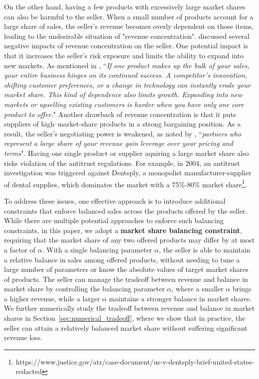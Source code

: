 \documentclass[mnsc,non-blindrev]{informs3}
\theoremstyle{definition}
\begin{document}
{On the other hand, having a few products with excessively large market shares can also be harmful to the seller. When a small number of products account for a large share of sales, the seller’s revenue becomes overly dependent on those items, leading to the undesirable situation of "revenue concentration". \cite{dealhub2025revenue} discussed several negative impacts of revenue concentration on the seller. One potential impact is that it increases the seller’s risk exposure and limits the ability to expand into new markets. As mentioned in \cite{dealhub2025revenue}, ``{\it If one product makes up the bulk of your sales, your entire business hinges on its continued success. A competitor’s innovation, shifting customer preferences, or a change in technology can instantly erode your market share. This kind of dependence also limits growth. Expanding into new markets or upselling existing customers is harder when you have only one core product to offer.}" Another drawback of revenue concentration is that it puts suppliers of high–market-share products in a strong bargaining position. As a result, the seller’s negotiating power is weakened, as noted by \cite{dealhub2025revenue}, ``{\it partners who represent a large share of your revenue gain leverage over your pricing and terms}". Having one single product or supplier aquiring a large market share also risks violation of the antitrust regulations. For example, in 2004, an antitrust investigation was triggered against Dentsply, a monopolist manufacturer-supplier of dental supplies, which dominates the market with a 75\%-80\% market share\footnote{https://www.justice.gov/atr/case-document/us-v-dentsply-brief-united-states-redacted}.

To address these issues, one effective approach is to introduce additional constraints that enforce balanced sales across the products offered by the seller. While there are multiple potential approaches to enforce such balancing constraints, in this paper, we adopt a {\bf market share balancing constraint}, requiring that the market share of any two offered products may differ by at most a factor of $\alpha$. With a single balancing parameter $\alpha$, the seller is able to maintain a relative balance in sales among offered products, without needing to tune a large number of parameters or know the absolute values of target market shares of products. The seller can manage the tradeoff between revenue and balance in market share by controlling the balancing parameter $\alpha$, where a smaller $\alpha$ brings a higher revenue, while a larger $\alpha$ maintains a stronger balance in market shares. We further numerically study the tradeoff between revenue and balance in market shares in Section~\ref{sec:numerical_tradeoff}, where we show that in practice, the seller can attain a relatively balanced market share without suffering significant revenue loss.

}
\end{document}
